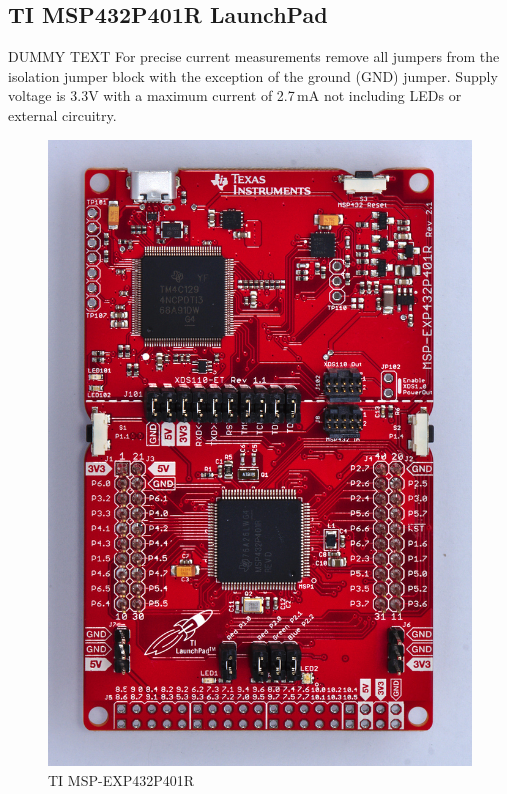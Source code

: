 \documentclass[twoside,11pt]{cergdoc}
\begin{document}
\subsection{TI MSP432P401R LaunchPad\texttrademark}

DUMMY TEXT For precise current measurements remove all jumpers from the isolation jumper block 
with the exception of the ground (GND) jumper. Supply voltage is 3.3V with a maximum 
current of 2.7\,mA not including LEDs or external circuitry.

\begin{figure}[ht]
  \begin{center}
    \includegraphics[scale=0.6]{figures/msp-exp432p401r}
    \caption{TI MSP-EXP432P401R}\label{fig:401}
  \end{center}
\vspace{-1ex}
\end{figure}
\end{document}
